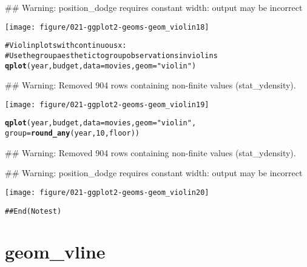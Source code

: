 \documentclass[a4paper,titlepage]{tufte-handout}\usepackage{graphicx, color}
\makeatletter
\def\maxwidth{ %
  \ifdim\Gin@nat@width>\linewidth
    \linewidth
  \else
    \Gin@nat@width
  \fi
}
\newcommand{\hlfunctioncall}[1]{\textcolor[rgb]{0.501960784313725,0,0.329411764705882}{\textbf{#1}}}%
\newcommand{\hlstring}[1]{\textcolor[rgb]{0.6,0.6,1}{#1}}%
\newcommand{\hlcomment}[1]{\textcolor[rgb]{0.180392156862745,0.6,0.341176470588235}{#1}}%
\newenvironment{kframe}{%
 \def\at@end@of@kframe{}%
 \ifinner\ifhmode%
  \def\at@end@of@kframe{\end{minipage}}%
  \begin{minipage}{\columnwidth}%
 \fi\fi%
 \def\FrameCommand##1{\hskip\@totalleftmargin \hskip-\fboxsep
 \colorbox{shadecolor}{##1}\hskip-\fboxsep
     \hskip-\linewidth \hskip-\@totalleftmargin \hskip\columnwidth}%
 \MakeFramed {\advance\hsize-\width
   \@totalleftmargin\z@ \linewidth\hsize
   \@setminipage}}%
 {\par\unskip\endMakeFramed%
 \at@end@of@kframe}
\newenvironment{knitrout}{}{} %
\makeatother
\begin{document}
\begin{knitrout}
\begin{kframe}
{\ttfamily\noindent\textcolor{warningcolor}{\#\# Warning: position\_dodge requires constant width: output may be incorrect}}\end{kframe}
\texttt{[image: figure/021-ggplot2-geoms-geom\_violin18]} 
\begin{kframe}\begin{alltt}

\hlcomment{# Violin plots with continuous x:}
\hlcomment{# Use the group aesthetic to group observations in violins}
\hlfunctioncall{qplot}(year, budget, data = movies, geom = \hlstring{"violin"})
\end{alltt}


{\ttfamily\noindent\textcolor{warningcolor}{\#\# Warning: Removed 904 rows containing non-finite values (stat\_ydensity).}}\end{kframe}
\texttt{[image: figure/021-ggplot2-geoms-geom\_violin19]} 
\begin{kframe}\begin{alltt}
\hlfunctioncall{qplot}(year, budget, data = movies, geom = \hlstring{"violin"},
  group = \hlfunctioncall{round_any}(year, 10, floor))
\end{alltt}


{\ttfamily\noindent\textcolor{warningcolor}{\#\# Warning: Removed 904 rows containing non-finite values (stat\_ydensity).}}

{\ttfamily\noindent\textcolor{warningcolor}{\#\# Warning: position\_dodge requires constant width: output may be incorrect}}\end{kframe}
\texttt{[image: figure/021-ggplot2-geoms-geom\_violin20]} 
\begin{kframe}\begin{alltt}
\hlcomment{## End(No test)}


\end{alltt}
\end{kframe}
\end{knitrout}



\section{geom\_vline}
\end{document}
